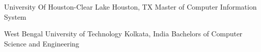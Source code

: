 \documentclass[10pt]{article}
\begin{document}
\spacedhrule{0.8ex}{0.0ex}

\headedsection
{University Of Houston-Clear Lake}
{Houston, TX}
{Master of Computer Information System }
{}

\headedsection
{West Bengal University of Technology}
{Kolkata, India}
{Bachelors of Computer Science and Engineering}
{}
\end{document}
